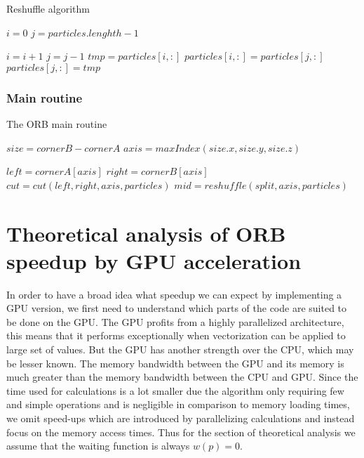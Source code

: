 \documentclass[]{article}
\begin{document}

\begin{algorithm}[H]
	\caption{Reshuffle algorithm}\label{euclid}
	\begin{algorithmic}[1]
		\State $i = 0$
		\State $j = particles.lenghth - 1$
		
		\State $i = i + 1$
		\State $j = j - 1$
		\Else
		\State $tmp = particles[i,:]$
		\State $particles[i,:] = particles[j,:]$
		\State $particles[j,:] = tmp$
		\EndIf
		\EndWhile\label{euclidendwhile}
		
		\EndProcedure
	\end{algorithmic}
\end{algorithm}

\subsubsection{Main routine}

\begin{algorithm}[H]
	\caption{The ORB main routine}\label{euclid}
	\begin{algorithmic}[1]
		\State $size = cornerB - cornerA$
		\State $axis = maxIndex(size.x, size.y, size.z)$ 
		
		\State $left = cornerA[axis]$
		\State $right = cornerB[axis]$
		\newline
		\State $cut = cut(left, right, axis, particles)$
		\State $mid = reshuffle(split, axis, particles)$
		\newline
		
		\State {}
		\EndProcedure
	\end{algorithmic}
\end{algorithm}


\vspace{5mm}


\section{Theoretical analysis of ORB speedup by GPU acceleration}

In order to have a broad idea what speedup we can expect by implementing a GPU version, we first need to understand which parts of the code are suited to be done on the GPU. The GPU profits from a highly parallelized architecture, this means that it performs exceptionally when vectorization can be applied to large set of values. But the GPU has another strength over the CPU, which may be lesser known. The memory bandwidth between the GPU and its memory is much greater than the memory bandwidth between the CPU and GPU. Since the time used for calculations is a lot smaller due the algorithm only requiring few and simple operations and is negligible in comparison to memory loading times, we omit speed-ups which are introduced by parallelizing calculations and instead focus on the memory access times. Thus for the section of theoretical analysis we assume that the waiting function is always $w(p) = 0$.
\end{document}
